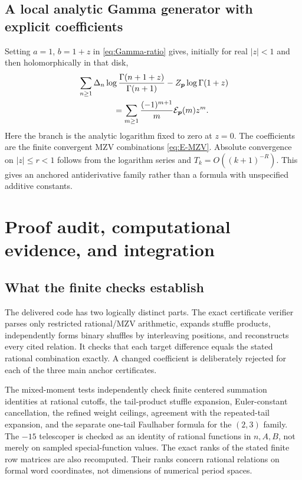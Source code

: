 \documentclass[11pt,letterpaper]{article}
\numberwithin{equation}{section}
\theoremstyle{definition}\newtheorem{definition}[theorem]{Definition}
\theoremstyle{remark}\newtheorem{remark}[theorem]{Remark}
\begin{document}
\subsection{A local analytic Gamma generator with explicit coefficients}

Setting $a=1$, $b=1+z$ in \eqref{eq:Gamma-ratio} gives, initially
for real $|z|<1$ and then holomorphically in that disk,
\begin{equation}\label{eq:Gamma-generator}
\begin{split}
 &\sum_{n\ge1}\Delta_n\log\frac{\Gamma(n+1+z)}{\Gamma(n+1)}
                  -Z_{\boldsymbol p}\log\Gamma(1+z)\\
 &\hspace{15mm}=\sum_{m\ge1}\frac{(-1)^{m+1}}m
                                     \mathcal E_{\boldsymbol p}(m)z^m.
\end{split}
\end{equation}
Here the branch is the analytic logarithm fixed to zero at $z=0$.
The coefficients are the finite convergent MZV combinations
\eqref{eq:E-MZV}. Absolute convergence on $|z|\le r<1$ follows
from the logarithm series and $T_k=O((k+1)^{-R})$.
This gives an anchored antiderivative family rather than a formula
with unspecified additive constants.

\section{Proof audit, computational evidence, and integration}
\label{sec:audit}

\subsection{What the finite checks establish}

The delivered code has two logically distinct parts. The exact
certificate verifier parses only restricted rational/MZV arithmetic,
expands stuffle products, independently forms binary shuffles by
interleaving positions, and reconstructs every cited relation.
It checks that each target difference equals the stated rational
combination exactly. A changed coefficient is deliberately rejected
for each of the three main anchor certificates.

The mixed-moment tests independently check finite centered summation
identities at rational cutoffs, the tail-product stuffle expansion,
Euler-constant cancellation, the refined weight ceilings, agreement
with the repeated-tail expansion, and the separate one-tail Faulhaber
formula for the $(2,3)$ family. The $-15$ telescoper is checked as
an identity of rational functions in $n,A,B$, not merely on sampled
special-function values. The exact ranks of the stated finite row
matrices are also recomputed. Their ranks concern rational relations
on formal word coordinates, not dimensions of numerical period spaces.
\end{document}
